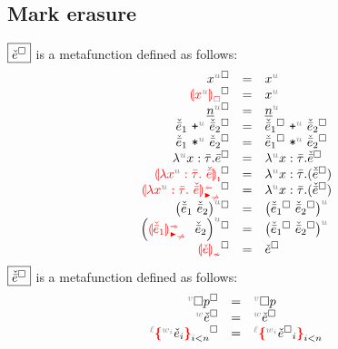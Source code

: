 \subsection{Mark erasure}
\label{sec:marked-mark-erasure}
$\judgbox{\markErase{\ECMV}}$ is a metafunction defined as follows:
%
\[\begin{array}{rcl}
  \erasesToRow{\eVar{u}{x}}{\eVar{u}{x}} \\
  \erasesToRow{\ECFree{\var{x}}}{\var{x}} \\
    \erasesToRow{\eNum{u}{n}}{\eNum{u}{n}} \\
  \erasesToRow{\plus{\ELMV_1}{\ELMV_2}}{\plus{\markErase{\ELMV_1}}{\markErase{\ELMV_2}}} \\
  \erasesToRow{\mult{\ELMV_1}{\ELMV_2}}{\mult{\markErase{\ELMV_1}}{\markErase{\ELMV_2}}} \\
  \erasesToRow{\reglam}{\lam{x}{\TLMV}{\markErase{\ELMV}}} \\
  \erasesToRow{\ECLamInconAsc{\var{x}}{\TLMV}{\ELMV}}{\lam{x}{\TLMV}{(\markErase{\ELMV})}} \\
  \erasesToRow{\ECLamAnaNonMatchedArrow{\var{x}}{\TLMV}{\ELMV}}{\lam{x}{\TLMV}{(\markErase{\ELMV})}} \\
  \erasesToRow{\eApp{u}{\ELMV_1}{\ELMV_2}}{\eApp{u}{\markErase{\ELMV_1}}{\markErase{\ELMV_2}}} \\
  \erasesToRow{\eApp{u}{\ECApSynNonMatchedArrow{\ELMV_1}}{\ELMV_2}}{\eApp{u}{\markErase{\ELMV_1}}{\markErase{\ELMV_2}}} \\
  \erasesToRow{\ECInconType{\ECMV}}{\markErase{\ECMV}} \\
\end{array}\]
$\judgbox{\markErase{\ELMV}}$ is a metafunction defined as follows:
%
\[\begin{array}{rcl}
    \erasesToRow{\emptyHole{v}{p}}{\emptyHole{v}{p}} \\
    \erasesToRow{\lexp{\ECMV}}{\lexp{\markErase{\ECMV}}} \\
    \erasesToRow{\conflict{\ECMV}}{\conflict{\markErase{\ECMV}}}
\end{array}\]


